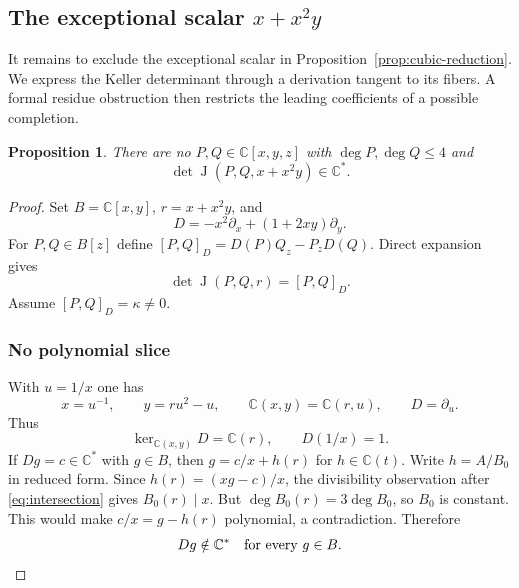 \documentclass[11pt,reqno]{amsart}
\numberwithin{equation}{section}
\theoremstyle{plain}
\newtheorem{proposition}[theorem]{Proposition}
\theoremstyle{definition}
\theoremstyle{remark}
\newcommand{\C}{\mathbb C}
\newcommand{\Ker}{\operatorname{ker}}
\newcommand{\J}{\operatorname J}
\begin{document}
\subsection{\texorpdfstring{The exceptional scalar $x+x^2y$}{The exceptional scalar x+x squared y}}\label{sec:exceptional-scalar}
It remains to exclude the exceptional scalar in
Proposition~\ref{prop:cubic-reduction}. We express the Keller determinant
through a derivation tangent to its fibers. A formal residue obstruction
then restricts the leading coefficients of a possible completion.
\begin{proposition}\label{prop:exceptional-scalar}
There are no $P,Q\in\C[x,y,z]$ with $\deg P,\deg Q\le4$ and
\[
\det\J(P,Q,x+x^2y)\in\C^*.
\]
\end{proposition}
\begin{proof}
Set $B=\C[x,y]$, $r=x+x^2y$, and
\[
D=-x^2\partial_x+(1+2xy)\partial_y.
\]
For $P,Q\in B[z]$ define $[P,Q]_D=D(P)Q_z-P_zD(Q)$. Direct expansion gives
\begin{equation}\label{eq:exceptional-bracket}
\det\J(P,Q,r)=[P,Q]_D.
\end{equation}
Assume $[P,Q]_D=\kappa\ne0$.

\subsubsection*{No polynomial slice}
With $u=1/x$ one has
\[
x=u^{-1},\qquad y=ru^2-u,\qquad
\C(x,y)=\C(r,u),\qquad D=\partial_u.
\]
Thus
\begin{equation}\label{eq:constant-field}
\Ker_{\C(x,y)}D=\C(r),\qquad D(1/x)=1.
\end{equation}
If $Dg=c\in\C^*$ with $g\in B$, then $g=c/x+h(r)$ for $h\in\C(t)$.
Write $h=A/B_0$ in reduced form.
Since $h(r)=(xg-c)/x$, the divisibility observation after \eqref{eq:intersection} gives $B_0(r)\mid x$.
But $\deg B_0(r)=3\deg B_0$, so $B_0$ is constant.
This would make $c/x=g-h(r)$ polynomial, a contradiction. Therefore
\begin{equation}\label{eq:no-slice}
Dg\notin\C^*\quad\hbox{for every }g\in B.
\end{equation}


\end{proof}
\end{document}
